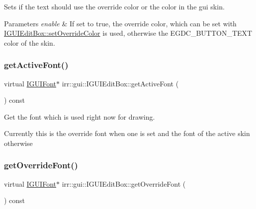 Sets if the text should use the override color or the color in the gui skin. 


\begin{DoxyParams}{Parameters}
{\em enable} & If set to true, the override color, which can be set with \hyperlink{classirr_1_1gui_1_1IGUIEditBox_aa134d2a36c52abcb4881da0267031c47}{I\+G\+U\+I\+Edit\+Box\+::set\+Override\+Color} is used, otherwise the E\+G\+D\+C\+\_\+\+B\+U\+T\+T\+O\+N\+\_\+\+T\+E\+XT color of the skin. \\
\hline
\end{DoxyParams}
\mbox{\label{classirr_1_1gui_1_1IGUIEditBox_a50542fa7f03a48458fac258a0949d987}} 
\subsubsection{\texorpdfstring{get\+Active\+Font()}{getActiveFont()}}
{\footnotesize\ttfamily virtual \hyperlink{classirr_1_1gui_1_1IGUIFont}{I\+G\+U\+I\+Font}$\ast$ irr\+::gui\+::\+I\+G\+U\+I\+Edit\+Box\+::get\+Active\+Font (\begin{DoxyParamCaption}{ }\end{DoxyParamCaption}) const\hspace{0.3cm}{\ttfamily [pure virtual]}}



Get the font which is used right now for drawing. 

Currently this is the override font when one is set and the font of the active skin otherwise \mbox{\label{classirr_1_1gui_1_1IGUIEditBox_a4c5e6749a5ac390d6a10303babd845b8}} 
\subsubsection{\texorpdfstring{get\+Override\+Font()}{getOverrideFont()}}
{\footnotesize\ttfamily virtual \hyperlink{classirr_1_1gui_1_1IGUIFont}{I\+G\+U\+I\+Font}$\ast$ irr\+::gui\+::\+I\+G\+U\+I\+Edit\+Box\+::get\+Override\+Font (\begin{DoxyParamCaption}{ }\end{DoxyParamCaption}) const\hspace{0.3cm}{\ttfamily [pure virtual]}}



